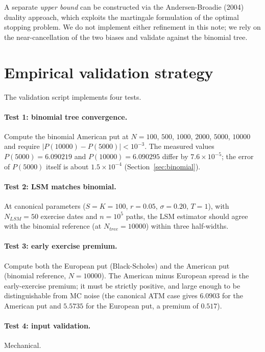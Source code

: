 \documentclass[11pt,a4paper]{article}
\theoremstyle{plain}
\theoremstyle{definition}
\theoremstyle{remark}
\begin{document}
A separate \emph{upper bound} can be constructed via the
Andersen-Broadie (2004) duality approach, which exploits the
martingale formulation of the optimal stopping problem. We do not
implement either refinement in this note; we rely on the
near-cancellation of the two biases and validate against the
binomial tree.

\section{Empirical validation strategy}
\label{sec:validation}

The validation script implements four tests.

\paragraph{Test 1: binomial tree convergence.} Compute the binomial
American put at $N = 100$, $500$, $1000$, $2000$, $5000$, $10000$
and require $|P(10000) - P(5000)| < 10^{-3}$. The measured values
$P(5000) = 6.090219$ and $P(10000) = 6.090295$ differ by
$7.6 \times 10^{-5}$; the error of $P(5000)$ itself is about
$1.5 \times 10^{-4}$ (Section~\ref{sec:binomial}).

\paragraph{Test 2: LSM matches binomial.} At canonical parameters
($S = K = 100$, $r = 0.05$, $\sigma = 0.20$, $T = 1$), with $N_{LSM} =
50$ exercise dates and $n = 10^5$ paths, the LSM estimator should
agree with the binomial reference (at $N_{tree} = 10000$) within
three half-widths.

\paragraph{Test 3: early exercise premium.} Compute both the European
put (Black-Scholes) and the American put (binomial reference,
$N = 10000$). The American minus European spread is the early-exercise
premium; it must be strictly positive, and large enough to be
distinguishable from MC noise (the canonical ATM case gives
$6.0903$ for the American put and $5.5735$ for the European put, a
premium of $0.517$).

\paragraph{Test 4: input validation.} Mechanical.
\end{document}
